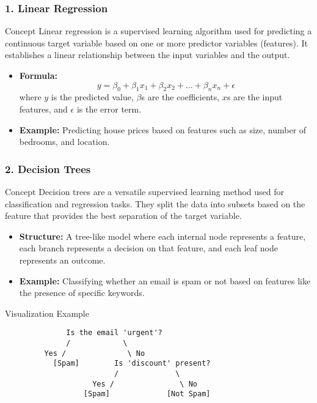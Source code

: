 \documentclass{beamer}
\begin{document}
\begin{frame}[fragile]
    \frametitle{1. Linear Regression}
    \begin{block}{Concept}
        Linear regression is a supervised learning algorithm used for predicting a continuous target variable based on one or more predictor variables (features). It establishes a linear relationship between the input variables and the output.
    \end{block}
    \begin{itemize}
        \item \textbf{Formula:}  
            \begin{equation}
                y = \beta_0 + \beta_1 x_1 + \beta_2 x_2 + \ldots + \beta_n x_n + \epsilon
            \end{equation}
            where \( y \) is the predicted value, \( \beta \)s are the coefficients, \( x \)s are the input features, and \( \epsilon \) is the error term.
        
        \item \textbf{Example:}  
            Predicting house prices based on features such as size, number of bedrooms, and location.
    \end{itemize}
\end{frame}

\begin{frame}[fragile]
    \frametitle{2. Decision Trees}
    \begin{block}{Concept}
        Decision trees are a versatile supervised learning method used for classification and regression tasks. They split the data into subsets based on the feature that provides the best separation of the target variable.
    \end{block}
    \begin{itemize}
        \item \textbf{Structure:}  
            A tree-like model where each internal node represents a feature, each branch represents a decision on that feature, and each leaf node represents an outcome.
        
        \item \textbf{Example:}  
            Classifying whether an email is spam or not based on features like the presence of specific keywords.
    \end{itemize}
    \begin{block}{Visualization Example}
        \begin{verbatim}
              Is the email 'urgent'?
              /            \
         Yes /              \ No
           [Spam]        Is 'discount' present?
                         /             \
                    Yes /               \ No
                  [Spam]             [Not Spam]
        \end{verbatim}
    \end{block}
\end{frame}
\end{document}
